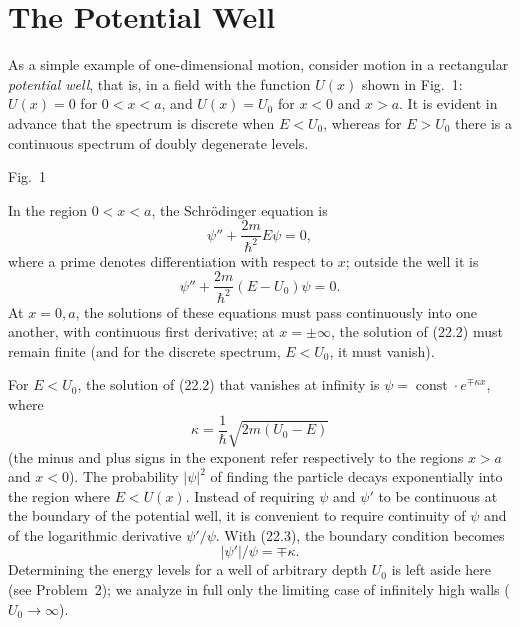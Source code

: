 \enlargethispage{-2\baselineskip}
\section{The Potential Well}

As a simple example of one-dimensional motion, consider motion in a
rectangular \emph{potential well}, that is, in a field with the function
$U(x)$ shown in Fig.~1: $U(x)=0$ for $0<x<a$, and $U(x)=U_0$ for $x<0$ and
$x>a$. It is evident in advance that the spectrum is discrete when $E<U_0$,
whereas for $E>U_0$ there is a continuous spectrum of doubly degenerate
levels.

\begin{center}
\begin{minipage}{0.62\linewidth}
\centering
{}

\small Fig.~1
\end{minipage}
\end{center}

In the region $0<x<a$, the Schrödinger equation is
\begin{equation}
  \psi''+\frac{2m}{\hbar^2}E\psi=0,
  \tag{22.1}
\end{equation}
where a prime denotes differentiation with respect to $x$; outside the well it
is
\begin{equation}
  \psi''+\frac{2m}{\hbar^2}(E-U_0)\psi=0.
  \tag{22.2}
\end{equation}
At $x=0,a$, the solutions of these equations must pass continuously into one
another, with continuous first derivative; at $x=\pm\infty$, the solution of
(22.2) must remain finite (and for the discrete spectrum, $E<U_0$, it must
vanish).

For $E<U_0$, the solution of (22.2) that vanishes at infinity is
$\psi=\operatorname{const}\cdot e^{\mp\kappa x}$, where
\begin{equation}
  \kappa=\frac{1}{\hbar}\sqrt{2m(U_0-E)}
  \tag{22.3}
\end{equation}
(the minus and plus signs in the exponent refer respectively to the regions
$x>a$ and $x<0$). The probability $|\psi|^2$ of finding the particle decays
exponentially into the region where $E<U(x)$. Instead of requiring $\psi$ and
$\psi'$ to be continuous at the boundary of the potential well, it is
convenient to require continuity of $\psi$ and of the logarithmic derivative
$\psi'/\psi$. With (22.3), the boundary condition becomes
\begin{equation}
  |\psi'|/\psi=\mp\kappa.
  \tag{22.4}
\end{equation}
Determining the energy levels for a well of arbitrary
depth $U_0$ is left aside here (see Problem~2); we analyze in full only the limiting case of
infinitely high walls ($U_0\to\infty$).

